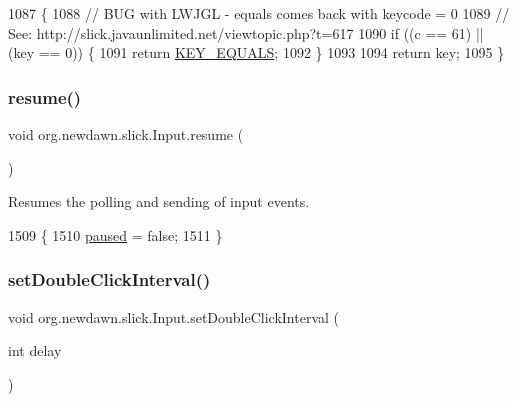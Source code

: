 \begin{DoxyCode}
1087                                                  \{
1088         \textcolor{comment}{// BUG with LWJGL - equals comes back with keycode = 0}
1089         \textcolor{comment}{// See: http://slick.javaunlimited.net/viewtopic.php?t=617}
1090         \textcolor{keywordflow}{if} ((c == 61) || (key == 0)) \{
1091             \textcolor{keywordflow}{return} \mbox{\hyperlink{classorg_1_1newdawn_1_1slick_1_1_input_a3deadf6ddd0e04ded18da42162f9ff02}{KEY\_EQUALS}};
1092         \}
1093         
1094         \textcolor{keywordflow}{return} key;
1095     \}
\end{DoxyCode}
\mbox{\label{classorg_1_1newdawn_1_1slick_1_1_input_acd8cba92da1d0f96462343e2853d92b7}} 
\subsubsection{\texorpdfstring{resume()}{resume()}}
{\footnotesize\ttfamily void org.\+newdawn.\+slick.\+Input.\+resume (\begin{DoxyParamCaption}{ }\end{DoxyParamCaption})\hspace{0.3cm}{\ttfamily [inline]}}

Resumes the polling and sending of input events. 
\begin{DoxyCode}
1509                          \{
1510         \mbox{\hyperlink{classorg_1_1newdawn_1_1slick_1_1_input_aaf9066433bbf1f7a1fc5738405412a32}{paused}} = \textcolor{keyword}{false};
1511     \}
\end{DoxyCode}
\mbox{\label{classorg_1_1newdawn_1_1slick_1_1_input_aee3b72f3ddced0779f193c783adb6f66}} 
\subsubsection{\texorpdfstring{set\+Double\+Click\+Interval()}{setDoubleClickInterval()}}
{\footnotesize\ttfamily void org.\+newdawn.\+slick.\+Input.\+set\+Double\+Click\+Interval (\begin{DoxyParamCaption}\item[{int}]{delay }\end{DoxyParamCaption})\hspace{0.3cm}{\ttfamily [inline]}}

